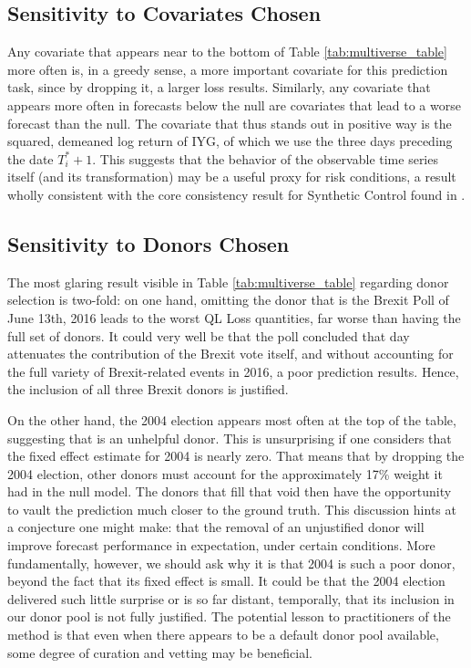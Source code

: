\documentclass{uiucthesis2021}
\theoremstyle{definition}
\begin{document}
     
\subsection{Sensitivity to Covariates Chosen}
Any covariate that appears near to the bottom of Table \ref{tab:multiverse_table} more often is, in a greedy sense, a more important covariate for this prediction task, since by dropping it, a larger loss results.  Similarly, any covariate that appears more often in forecasts below the null are covariates that lead to a worse forecast than the null.  The covariate that thus stands out in positive way is the squared, demeaned log return of IYG, of which we use the three days preceding the date $T_{i}^{*}+1$.  This suggests that the behavior of the observable time series itself (and its transformation) may be a useful proxy for risk conditions, a result wholly consistent with the core consistency result for Synthetic Control found in \cite[][]{abadie2010synthetic}.

\subsection{Sensitivity to Donors Chosen}

The most glaring result visible in Table \ref{tab:multiverse_table} regarding donor selection is two-fold: on one hand, omitting the donor that is the Brexit Poll of June 13th, 2016 leads to the worst QL Loss quantities, far worse than having the full set of donors.  It could very well be that the poll concluded that day attenuates the contribution of the Brexit vote itself, and without accounting for the full variety of Brexit-related events in 2016, a poor prediction results.  Hence, the inclusion of all three Brexit donors is justified.  

On the other hand, the 2004 election appears most often at the top of the table, suggesting that is an unhelpful donor.  This is unsurprising if one considers that the fixed effect estimate for 2004 is nearly zero.  That means that by dropping the 2004 election, other donors must account for the approximately 17\% weight it had in the null model.  The donors that fill that void then have the opportunity to vault the prediction much closer to the ground truth.  This discussion hints at a conjecture one might make: that the removal of an unjustified donor will improve forecast performance in expectation, under certain conditions.  More fundamentally, however, we should ask why it is that 2004 is such a poor donor, beyond the fact that its fixed effect is small.  It could be that the 2004 election delivered such little surprise or is so far distant, temporally, that its inclusion in our donor pool is not fully justified.  The potential lesson to practitioners of the method is that even when there appears to be a default donor pool available, some degree of curation and vetting may be beneficial.
\end{document}
